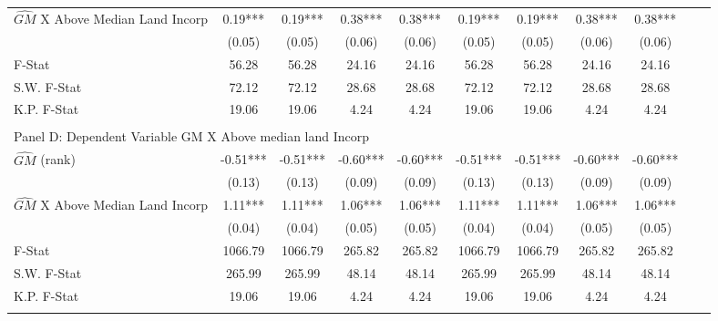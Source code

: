 \begin{table}[htbp]
\begin{threeparttable}
\begin{tabular}{l*{10}{c}}
\addlinespace
$\hat{GM}$ X Above Median Land Incorp&       0.19***&       0.19***&       0.38***&       0.38***&       0.19***&       0.19***&       0.38***&       0.38***\\
                &     (0.05)   &     (0.05)   &     (0.06)   &     (0.06)   &     (0.05)   &     (0.05)   &     (0.06)   &     (0.06)   \\
\midrule
F-Stat          &      56.28   &      56.28   &      24.16   &      24.16   &      56.28   &      56.28   &      24.16   &      24.16   \\
S.W. F-Stat     &      72.12   &      72.12   &      28.68   &      28.68   &      72.12   &      72.12   &      28.68   &      28.68   \\
K.P. F-Stat     &      19.06   &      19.06   &       4.24   &       4.24   &      19.06   &      19.06   &       4.24   &       4.24   \\
\cmidrule[\heavyrulewidth](lr){1-9} \\ \cmidrule[\heavyrulewidth](lr){1-9}
\multicolumn{8}{l}{Panel D: Dependent Variable GM X Above median land Incorp}\\
\cmidrule(lr){1-9}
$\hat{GM}$ (rank)&      -0.51***&      -0.51***&      -0.60***&      -0.60***&      -0.51***&      -0.51***&      -0.60***&      -0.60***\\
                &     (0.13)   &     (0.13)   &     (0.09)   &     (0.09)   &     (0.13)   &     (0.13)   &     (0.09)   &     (0.09)   \\
\addlinespace
$\hat{GM}$ X Above Median Land Incorp&       1.11***&       1.11***&       1.06***&       1.06***&       1.11***&       1.11***&       1.06***&       1.06***\\
                &     (0.04)   &     (0.04)   &     (0.05)   &     (0.05)   &     (0.04)   &     (0.04)   &     (0.05)   &     (0.05)   \\
\midrule
F-Stat          &    1066.79   &    1066.79   &     265.82   &     265.82   &    1066.79   &    1066.79   &     265.82   &     265.82   \\
S.W. F-Stat     &     265.99   &     265.99   &      48.14   &      48.14   &     265.99   &     265.99   &      48.14   &      48.14   \\
K.P. F-Stat     &      19.06   &      19.06   &       4.24   &       4.24   &      19.06   &      19.06   &       4.24   &       4.24   \\
\cmidrule[\heavyrulewidth](lr){1-9} \\ \cmidrule[\heavyrulewidth](lr){1-9}

\end{tabular}
\end{threeparttable}
\end{table}
